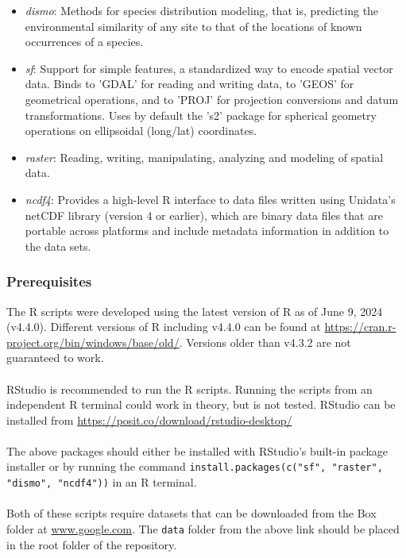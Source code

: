 \documentclass{article}
\begin{document}
\begin{itemize}
	\item \textit{dismo}: Methods for species distribution modeling, that is, predicting the environmental similarity of any site to that of the locations of known occurrences of a species.
	\item \textit{sf}: Support for simple features, a standardized way to encode spatial vector data. Binds to 'GDAL' for reading and writing data, to 'GEOS' for geometrical operations, and to 'PROJ' for projection conversions and datum transformations. Uses by default the 's2' package for spherical geometry operations on ellipsoidal (long/lat) coordinates.
	\item \textit{raster}: Reading, writing, manipulating, analyzing and modeling of spatial data. 
	\item \textit{ncdf4}: Provides a high-level R interface to data files written using Unidata's netCDF library (version 4 or earlier), which are binary data files that are portable across platforms and include metadata information in addition to the data sets.
\end{itemize}

\subsubsection*{Prerequisites}

The R scripts were developed using the latest version of R as of June 9, 2024 (v4.4.0). Different versions of R including v4.4.0 can be found at \url{https://cran.r-project.org/bin/windows/base/old/}. Versions older than v4.3.2 are not guaranteed to work.
\\\\
RStudio is recommended to run the R scripts. Running the scripts from an independent R terminal could work in theory, but is not tested. RStudio can be installed from \url{https://posit.co/download/rstudio-desktop/}
\\\\
The above packages should either be installed with RStudio's built-in package installer or by running the command \texttt{install.packages(c("sf", "raster", "dismo", "ncdf4"))} in an R terminal.
\\\\
Both of these scripts require datasets that can be downloaded from the Box folder at \url{www.google.com}. The \texttt{data} folder from the above link should be placed in the root folder of the repository. 
\end{document}

